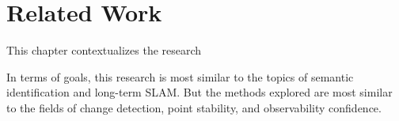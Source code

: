 \section{Related Work}
\label{sec:related_work}

This chapter contextualizes the research 

In terms of goals, this research is most similar to the topics of semantic identification and long-term SLAM. But the methods explored are most similar to the fields of change detection, point stability, and observability confidence.

% 